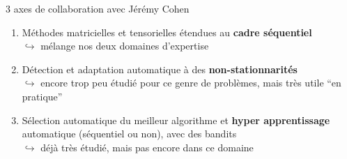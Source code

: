 \documentclass[11pt,english,ignorenonframetext,]{beamer}
\providecommand{\tightlist}{%
  \setlength{\itemsep}{0pt}\setlength{\parskip}{0pt}}
\begin{document}
\begin{frame}{3 axes de collaboration avec Jérémy Cohen}

\begin{enumerate}[1.]
\item
  \alert<1>{Méthodes matricielles et tensorielles étendues au \textbf<1>{cadre séquentiel}} \\
  \(\hookrightarrow\) mélange nos deux domaines d'expertise
\vspace*{20pt}
\pause
\item
  \alert<2>{Détection et adaptation automatique à des \textbf<2>{non-stationnarités}} \\
  \(\hookrightarrow\) encore trop peu étudié pour ce genre de problèmes, mais très utile ``en pratique''
\vspace*{20pt}
\pause
\item
  \alert<3>{Sélection automatique du meilleur algorithme et \textbf<3>{hyper apprentissage} automatique (séquentiel ou non), avec des bandits} \\
  \(\hookrightarrow\) déjà très étudié, mais pas encore dans ce domaine
\end{enumerate}



\end{frame}





\end{document}
